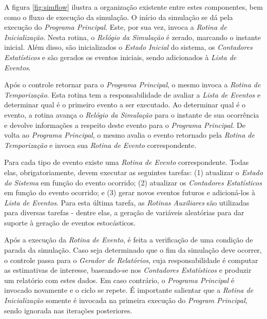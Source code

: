 A figura \ref{fig:simflow} ilustra a organização existente entre estes
componentes, bem como o fluxo de execução da simulação. O início da simulação se
dá pela execução do \textit{Programa Principal}. Este, por sua vez, invoca a
\textit{Rotina de Inicialização}. Nesta rotina, o \textit{Relógio da Simulação}
é zerado, marcando o instante inicial. Além disso, são inicializados o
\textit{Estado Inicial} do sistema, os \textit{Contadores Estatísticos} e são
gerados os eventos iniciais, sendo adicionados à \textit{Lista de Eventos}.

Após o controle retornar para o \textit{Programa Principal}, o mesmo invoca a
\textit{Rotina de Temporização}. Esta rotina tem a responsabilidade de avaliar a
\textit{Lista de Eventos} e determinar qual é o primeiro evento a ser executado.
Ao determinar qual é o evento, a rotina avança o \textit{Relógio da Simulação}
para o instante de sua ocorrência e devolve informações a respeito deste evento
para o \textit{Programa Principal}. De volta ao \textit{Programa Principal}, o
mesmo avalia o evento retornado pela \textit{Rotina de Temporização} e invoca
sua \textit{Rotina de Evento} correspondente.

Para cada tipo de evento existe uma \textit{Rotina de Evento} correspondente.
Todas elas, obrigatoriamente, devem executar as seguintes tarefas: (1) atualizar
o \textit{Estado do Sistema} em função do evento ocorrido; (2) atualizar os
\textit{Contadores Estatísticos} em função do evento ocorrido; e (3) gerar
novos eventos futuros e adicioná-los à \textit{Lista de Eventos}. Para esta
última tarefa, as \textit{Rotinas Auxiliares} são utilizadas para diversas
tarefas - dentre elas, a geração de variáveis aleatórias para dar suporte à
geração de eventos estocásticos.

Após a execução da \textit{Rotina de Evento}, é feita a verificação de uma
condição de parada da simulação. Caso seja determinado que o fim da simulação
deve ocorrer, o controle passa para o \textit{Gerador de Relatórios}, cuja
responsabilidade é computar as estimativas de interesse, baseando-se nos
\textit{Contadores Estatísticos} e produzir um relatório com estes dados. Em
caso contrário, o \textit{Programa Principal} é invocado novamente e o ciclo se
repete. É importante salientar que a \textit{Rotina de Inicialização} somente é
invocada na primeira execução do \textit{Program Principal}, sendo ignorada nas
iterações posteriores.

